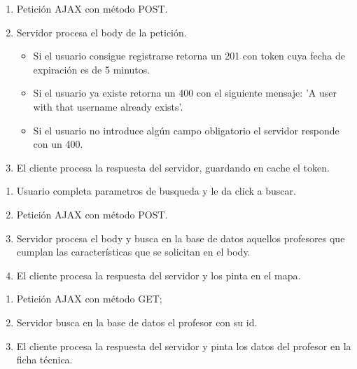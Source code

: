 \documentclass[notes,slidesec,a4]{seminar}
\begin{document}
\begin{hslide}
\begin{enumerate}
\item Petición AJAX con método POST.
\item Servidor procesa el body de la petición.
\begin{itemize}
\item Si el usuario consigue registrarse retorna un 201 con token cuya fecha de expiración es de 5 minutos.
\item Si el usuario ya existe retorna un 400 con el siguiente mensaje: 'A user with that username already exists'.
\item Si el usuario no introduce algún campo obligatorio el servidor responde con un 400.
\end{itemize}
\item El cliente procesa la respuesta del servidor, guardando en cache el token.
\end{enumerate}
\end{hslide}




\begin{hslide}
\begin{enumerate}
\item Usuario completa parametros de busqueda y le da click a buscar.
\item Petición AJAX con método POST.
\item Servidor procesa el body y busca en la base de datos aquellos profesores que cumplan las características que se solicitan en el body.
\item El cliente procesa la respuesta del servidor y los pinta en el mapa.
\end{enumerate}
\end{hslide}


\begin{hslide}
\begin{enumerate}
\item Petición AJAX con método GET;
\item Servidor busca en la base de datos el profesor con su id.
\item El cliente procesa la respuesta del servidor y pinta los datos del profesor en la ficha técnica.
\end{enumerate}
\end{hslide}
\end{document}
